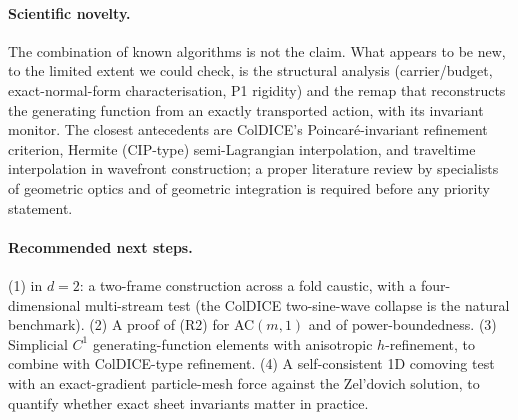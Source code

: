 \paragraph{Scientific novelty.} The combination of known algorithms is not the claim. What appears to be new, to
the limited extent we could check, is the structural analysis (carrier/budget, exact-normal-form
characterisation, P1 rigidity) and the remap that reconstructs the generating function from an exactly transported
action, with its invariant monitor. The closest antecedents are ColDICE's Poincar\'e-invariant refinement
criterion, Hermite (CIP-type) semi-Lagrangian interpolation, and traveltime interpolation in wavefront
construction; a proper literature review by specialists of geometric optics and of geometric integration is
required before any priority statement.

\paragraph{Recommended next steps.} (1)  in $d=2$: a two-frame construction across a fold caustic,
with a four-dimensional multi-stream test (the ColDICE two-sine-wave collapse is the natural benchmark). (2) A
proof of (R2) for AC$(m,1)$ and of power-boundedness. (3) Simplicial $C^1$ generating-function elements with
anisotropic $h$-refinement, to combine with ColDICE-type refinement. (4) A self-consistent 1D comoving test with an
exact-gradient particle-mesh force against the Zel'dovich solution, to quantify whether exact sheet invariants
matter in practice.
